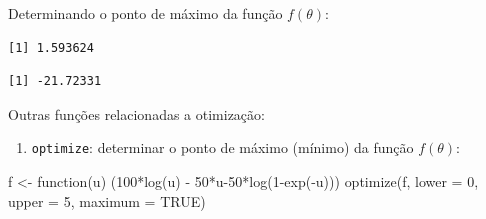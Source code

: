 \documentclass[
  letterpaper,
  DIV=11,
  numbers=noendperiod]{scrreprt}
\newenvironment{Shaded}{\begin{snugshade}}{\end{snugshade}}
\newcommand{\AttributeTok}[1]{\textcolor[rgb]{0.40,0.45,0.13}{#1}}
\newcommand{\CommentTok}[1]{\textcolor[rgb]{0.37,0.37,0.37}{#1}}
\newcommand{\ConstantTok}[1]{\textcolor[rgb]{0.56,0.35,0.01}{#1}}
\newcommand{\ControlFlowTok}[1]{\textcolor[rgb]{0.00,0.23,0.31}{#1}}
\newcommand{\DecValTok}[1]{\textcolor[rgb]{0.68,0.00,0.00}{#1}}
\newcommand{\FunctionTok}[1]{\textcolor[rgb]{0.28,0.35,0.67}{#1}}
\newcommand{\NormalTok}[1]{\textcolor[rgb]{0.00,0.23,0.31}{#1}}
\newcommand{\OtherTok}[1]{\textcolor[rgb]{0.00,0.23,0.31}{#1}}
\newcommand{\SpecialCharTok}[1]{\textcolor[rgb]{0.37,0.37,0.37}{#1}}
\providecommand{\tightlist}{%
  \setlength{\itemsep}{0pt}\setlength{\parskip}{0pt}}\usepackage{longtable,booktabs,array}
\begin{document}
Determinando o ponto de máximo da função \(f(\theta):\)

\begin{Shaded}
\end{Shaded}

\begin{verbatim}
[1] 1.593624
\end{verbatim}

\begin{Shaded}
\end{Shaded}

\begin{verbatim}
[1] -21.72331
\end{verbatim}

Outras funções relacionadas a otimização:

\begin{enumerate}
\def\labelenumi{\arabic{enumi}.}
\tightlist
\item
  \texttt{optimize}: determinar o ponto de máximo (mínimo) da função
  \(f(\theta)\):
\end{enumerate}

\begin{Shaded}
\begin{Highlighting}[]
\NormalTok{f }\OtherTok{\textless{}{-}} \ControlFlowTok{function}\NormalTok{(u) (}\DecValTok{100}\SpecialCharTok{*}\FunctionTok{log}\NormalTok{(u) }\SpecialCharTok{{-}} \DecValTok{50}\SpecialCharTok{*}\NormalTok{u}\DecValTok{{-}50}\SpecialCharTok{*}\FunctionTok{log}\NormalTok{(}\DecValTok{1}\SpecialCharTok{{-}}\FunctionTok{exp}\NormalTok{(}\SpecialCharTok{{-}}\NormalTok{u)))}
\FunctionTok{optimize}\NormalTok{(f, }\AttributeTok{lower =} \DecValTok{0}\NormalTok{, }\AttributeTok{upper =} \DecValTok{5}\NormalTok{, }\AttributeTok{maximum =} \ConstantTok{TRUE}\NormalTok{)}
\end{Highlighting}
\end{Shaded}
\end{document}
